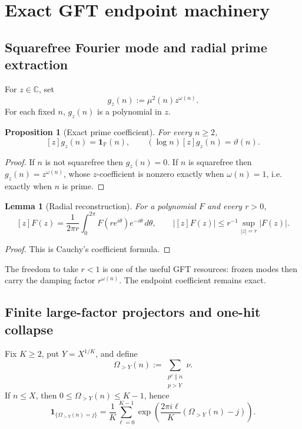 \documentclass[11pt]{article}
\newtheorem{lemma}[theorem]{Lemma}
\newtheorem{proposition}[theorem]{Proposition}
\theoremstyle{definition}
\theoremstyle{remark}
\newcommand{\Pp}{\mathbb P}
\newcommand{\1}{\mathbf 1}
\begin{document}
\section{Exact GFT endpoint machinery}\label{sec:gft-endpoint}

\subsection{Squarefree Fourier mode and radial prime extraction}

For \(z\in\mathbb C\), set
\begin{equation}\label{eq:gz}
 g_z(n):=\mu^2(n)z^{\omega(n)}.
\end{equation}
For each fixed \(n\), \(g_z(n)\) is a polynomial in \(z\).

\begin{proposition}[Exact prime coefficient]\label{prop:prime-coeff}
For every \(n\ge2\),
\[
 [z]g_z(n)=\1_{\Pp}(n),
 \qquad
 (\log n)[z]g_z(n)=\vartheta(n).
\]
\end{proposition}

\begin{proof}
If \(n\) is not squarefree then \(g_z(n)=0\).  If \(n\) is squarefree then \(g_z(n)=z^{\omega(n)}\), whose \(z\)-coefficient is nonzero exactly when \(\omega(n)=1\), i.e. exactly when \(n\) is prime.
\end{proof}

\begin{lemma}[Radial reconstruction]\label{lem:radial}
For a polynomial \(F\) and every \(r>0\),
\[
 [z]F(z)=\frac1{2\pi r}\int_0^{2\pi}F(re^{i\theta})e^{-i\theta}\,d\theta,
 \qquad
 |[z]F(z)|\le r^{-1}\sup_{|z|=r}|F(z)|.
\]
\end{lemma}

\begin{proof}
This is Cauchy's coefficient formula.
\end{proof}

The freedom to take \(r<1\) is one of the useful GFT resources: frozen modes then carry the damping factor \(r^{\omega(n)}\).  The endpoint coefficient remains exact.

\subsection{Finite large-factor projectors and one-hit collapse}

Fix \(K\ge2\), put \(Y=X^{1/K}\), and define
\[
 \Omega_{>Y}(n):=\sum_{\substack{p^\nu\parallel n\\p>Y}}\nu.
\]
If \(n\le X\), then \(0\le\Omega_{>Y}(n)\le K-1\), hence
\begin{equation}\label{eq:DFT-hit}
 \1_{\{\Omega_{>Y}(n)=j\}}
 =\frac1K\sum_{\ell=0}^{K-1}
 \exp\!\left(\frac{2\pi i\ell}{K}(\Omega_{>Y}(n)-j)\right).
\end{equation}
\end{document}

